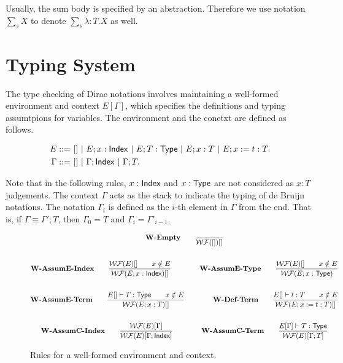 \documentclass{article}
\begin{document}
Usually, the sum body is specified by an abstraction. Therefore we use notation $\sum_s X$ to denote $\sum_{s} \lambda : T . X$ as well.
 
\section{Typing System}
The type checking of Dirac notations involves maintaining a well-formed environment and context $E[\Gamma]$, which specifies the definitions and typing assumtpions for variables.
The environment and the conetxt are defined as follows.

\begin{definition}
    \begin{align*}
        E ::=\ & []\ |\ E; x : \Index\ |\ E; T : \Type\ |\ E; x : T\ |\ E; x := t : T. \\
        \Gamma ::=\ & []\ |\ \Gamma; \Index\ |\ \Gamma; T.
    \end{align*}
\end{definition}

Note that in the following rules, $x : \mathsf{Index}$ and $x : \mathsf{Type}$ are not considered as $x : T$ judgements. The context $\Gamma$ acts as the stack to indicate the typing of de Bruijn notations. The notation $\Gamma_i$ is defined as the $i$-th element in $\Gamma$ from the end. That is, if $\Gamma \equiv \Gamma'; T$, then $\Gamma_0 = T$ and $\Gamma_i = \Gamma'_{i-1}$.

\begin{figure}[h]
    \begin{gather*}
        \textbf{W-Empty} \qquad
        \frac{}{\mathcal{WF}([])[]} \\
        \\
        \textbf{W-AssumE-Index} \qquad
        \frac{\mathcal{WF}(E)[] \qquad x \notin E}{\mathcal{WF}(E; x : \mathsf{Index})[]}\qquad \qquad
        \textbf{W-AssumE-Type} \qquad
        \frac{\mathcal{WF}(E)[] \qquad x \notin E}{\mathcal{WF}(E; x : \mathsf{Type})} \\
        \\
        \textbf{W-AssumE-Term} \qquad
        \frac{E[] \vdash T : \mathsf{Type} \qquad x \notin E}{\mathcal{WF}(E; x:T)[]}
        \qquad \qquad
        \textbf{W-Def-Term} \qquad
        \frac{E[]\vdash t:T \qquad x \notin E}{\mathcal{WF}(E; x:=t:T)[]} \\
        \\
        \textbf{W-AssumC-Index} \qquad
        \frac{\mathcal{WF}(E)[\Gamma]}{\mathcal{WF}(E)[\Gamma; \mathsf{Index}]}
        \qquad \qquad
        \textbf{W-AssumC-Term} \qquad
        \frac{E[\Gamma] \vdash T : \mathsf{Type}}{\mathcal{WF}(E)[\Gamma; T]}
    \end{gather*}
    \caption{Rules for a well-formed environment and context.}
\end{figure}
\end{document}
